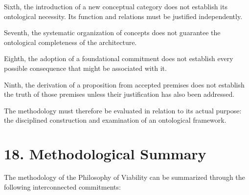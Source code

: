 Sixth, the introduction
of a new conceptual category
does not establish its
ontological necessity.
Its function and relations
must be justified independently.

Seventh, the systematic
organization of concepts
does not guarantee the
ontological completeness
of the architecture.

Eighth, the adoption of
a foundational commitment
does not establish every
possible consequence that
might be associated with it.

Ninth, the derivation of
a proposition from accepted
premises does not establish
the truth of those premises
unless their justification
has also been addressed.

The methodology must therefore
be evaluated in relation
to its actual purpose:
the disciplined construction
and examination of an
ontological framework.


\section*{18. Methodological Summary}

The methodology of the Philosophy
of Viability can be summarized
through the following interconnected
commitments:

